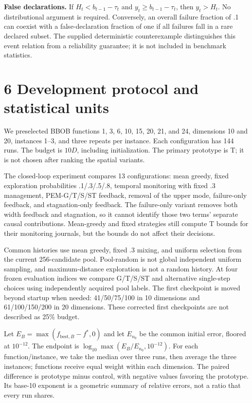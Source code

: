 \documentclass[11pt,a4paper]{article}
\begin{document}
\textbf{False declarations.} If \(H_t<b_{t-1}-\tau_t\) and
\(y_t\ge b_{t-1}-\tau_t\), then \(y_t>H_t\). No distributional argument
is required. Conversely, an overall failure fraction of .1 can coexist
with a false-declaration fraction of one if all failures fall in a rare
declared subset. The supplied deterministic counterexample distinguishes
this event relation from a reliability guarantee; it is not included in
benchmark statistics.

\hypertarget{development-protocol-and-statistical-units}{%
\section{6 Development protocol and statistical
units}\label{development-protocol-and-statistical-units}}

We preselected BBOB functions 1, 3, 6, 10, 15, 20, 21, and 24,
dimensions 10 and 20, instances 1--3, and three repeats per instance.
Each configuration has 144 runs. The budget is \(10D\), including
initialization. The primary prototype is T; it is not chosen after
ranking the spatial variants.

The closed-loop experiment compares 13 configurations: mean greedy,
fixed exploration probabilities .1/.3/.5/.8, temporal monitoring with
fixed .3 management, PEM-G/T/S/ST feedback, removal of the upper mode,
failure-only feedback, and stagnation-only feedback. The failure-only
variant removes both width feedback and stagnation, so it cannot
identify those two terms' separate causal contributions. Mean-greedy and
fixed strategies still compute T bounds for their monitoring journals,
but the bounds do not affect their decisions.

Common histories use mean greedy, fixed .3 mixing, and uniform selection
from the current 256-candidate pool. Pool-random is not global
independent uniform sampling, and maximum-distance exploration is not a
random history. At four frozen evaluation indices we compare G/T/S/ST
and alternative single-step choices using independently acquired pool
labels. The first checkpoint is moved beyond startup when needed:
41/50/75/100 in 10 dimensions and 61/100/150/200 in 20 dimensions. These
corrected first checkpoints are not described as 25\% budget.

Let \(E_B=\max(f_{\mathrm{best},B}-f^*,0)\) and let \(E_{n_0}\) be the
common initial error, floored at \(10^{-12}\). The endpoint is
\(\log_{10}\max(E_B/E_{n_0},10^{-12})\). For each function/instance, we
take the median over three runs, then average the three instances;
functions receive equal weight within each dimension. The paired
difference is prototype minus control, with negative values favoring the
prototype. Its base-10 exponent is a geometric summary of relative
errors, not a ratio that every run shares.
\end{document}
